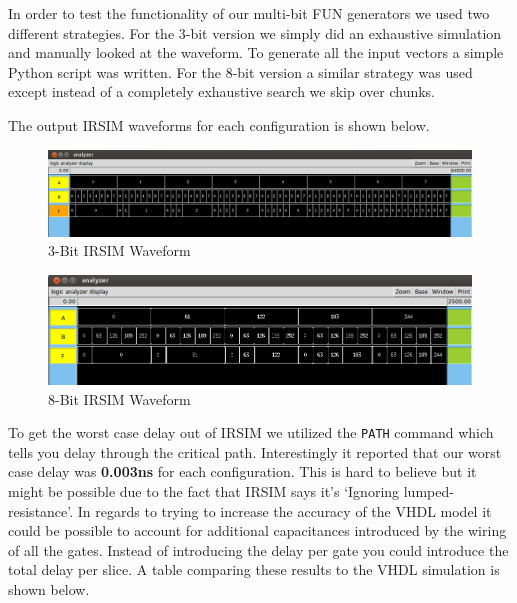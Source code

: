 \documentclass{article}
\begin{document}
\newpage
In order to test the functionality of our multi-bit FUN generators we used two different
strategies. For the 3-bit version we simply did an exhaustive simulation and manually
looked at the waveform. To generate all the input vectors a simple Python script was
written. For the 8-bit version a similar strategy was used except instead of a completely
exhaustive search we skip over chunks.



The output IRSIM waveforms for each configuration is shown below.

\begin{figure}[H]
    \centering
    \includegraphics[width=\linewidth]{../part_5/irsim_3.png}
    \caption{3-Bit IRSIM Waveform}
\end{figure}

\begin{figure}[H]

    \centering
    \includegraphics[width=\linewidth]{../part_5/irsim_8.png}
    \caption{8-Bit IRSIM Waveform}
\end{figure}

\vspace{0.125in}
To get the worst case delay out of IRSIM we utilized the \texttt{PATH} command
which tells you delay through the critical path. Interestingly it reported that
our worst case delay was \textbf{0.003ns} for each configuration. This is hard
to believe but it might be possible due to the fact that IRSIM says it's
`Ignoring lumped-resistance'. In regards to trying to increase the accuracy of
the VHDL model it could be possible to account for additional capacitances
introduced by the wiring of all the gates. Instead of introducing the delay per
gate you could introduce the total delay per slice. A table comparing these
results to the VHDL simulation is shown below.
\end{document}
